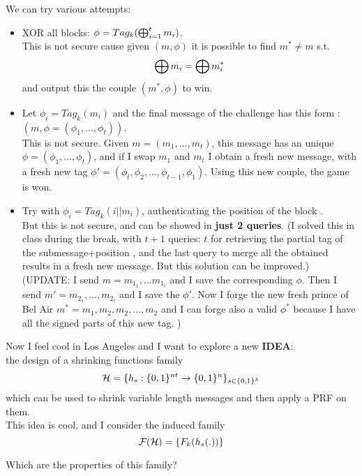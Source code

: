 We can try various attempts:
\begin{itemize}
    
    
    
    \item \label{xorall}XOR all blocks: $\phi=Tag_{k}(\bigoplus_{i=1}^{t}m_{i})$.\\
        This is not secure cause given $(m, \phi)$ it is possible to find
       $m^{*}\not= m$ s.t.
       \[
\bigoplus m_{i} = \bigoplus m_{i}^{*}
        \]
        and output this the couple $(m^{*}, \phi)$ to win.

    


    \item Let $\phi_{i}=Tag_{k}(m_{i})$ and the final message of the challenge
        has this form : $(m, \phi=(\phi_{1}, ..., \phi_{t}))$.\\
        This is not secure. Given $m=(m_{1}, ..., m_{t})$, this message has an
        unique $\phi=(\phi_{1}, ..., \phi_{t})$, and if I swap $m_{1}$ and
        $m_{t}$ I obtain a fresh new message, with a fresh new tag
        $\phi'=(\phi_{t}, \phi_{2}, ..., \phi_{t-1}, \phi_{1})$.
        Using this new couple, the game is won.



    \item Try with $\phi_{i}=Tag_{k}(i||m_{i})$, authenticating the position of
        the block .\\
        But this is not secure, and can be showed in \textbf{just 2 queries}.
        (I solved this in class during the break, with $t+1$ queries: $t$ for
        retrieving the partial tag of the submessage+position , and the last
        query to merge all the obtained results in a fresh new message. But this
        solution can be improved.)
        (UPDATE: I send  $m=m_{1_{1}}, ...m_{1_{t}}$ and I save the
        corresponding $\phi$. Then I send $m'=m_{2_{1}}, ..., m_{2_{t}}$ and I
        save the $\phi'$. Now I forge the new fresh prince of Bel Air
        $m^{*}=m_{1}, m_{2}, m_{2}, ...,m_{2}$
        and I can forge also a valid $\phi^{*}$ because I have all the
        signed parts of this new tag. )
        

\end{itemize}

Now I feel cool in Los Angeles and I want to explore a new \textbf{IDEA}:\\
the design of a shrinking functions family 
\[
   \mathcal{H}= \{ h_{s}:\{0,1\}^{nt} \to \{0,1\}^{n} \}_{s \in \{0,1\}^{\lambda}}
\]
which can be used to shrink variable length messages and then apply a PRF on
them.\\
This idea is cool, and I consider the induced family
\[
    \mathcal{F}(\mathcal{H})=\{F_{k}(h_{s}(.))\}
\]
\begin{question}
Which are the properties of this family?
\end{question}

